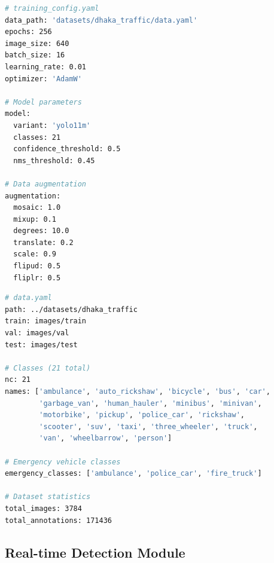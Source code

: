 \begin{lstlisting}[language=bash, caption=Training Configuration, label=lst:training_config]
# training_config.yaml
data_path: 'datasets/dhaka_traffic/data.yaml'
epochs: 256
image_size: 640
batch_size: 16
learning_rate: 0.01
optimizer: 'AdamW'

# Model parameters
model:
  variant: 'yolo11m'
  classes: 21
  confidence_threshold: 0.5
  nms_threshold: 0.45

# Data augmentation
augmentation:
  mosaic: 1.0
  mixup: 0.1
  degrees: 10.0
  translate: 0.2
  scale: 0.9
  flipud: 0.5
  fliplr: 0.5
\end{lstlisting}

\begin{lstlisting}[language=bash, caption=Dataset Configuration, label=lst:dataset_config]
# data.yaml
path: ../datasets/dhaka_traffic
train: images/train
val: images/val
test: images/test

# Classes (21 total)
nc: 21
names: ['ambulance', 'auto_rickshaw', 'bicycle', 'bus', 'car',
        'garbage_van', 'human_hauler', 'minibus', 'minivan',
        'motorbike', 'pickup', 'police_car', 'rickshaw',
        'scooter', 'suv', 'taxi', 'three_wheeler', 'truck',
        'van', 'wheelbarrow', 'person']

# Emergency vehicle classes
emergency_classes: ['ambulance', 'police_car', 'fire_truck']

# Dataset statistics
total_images: 3784
total_annotations: 171436
\end{lstlisting}

\subsection{Real-time Detection Module}

